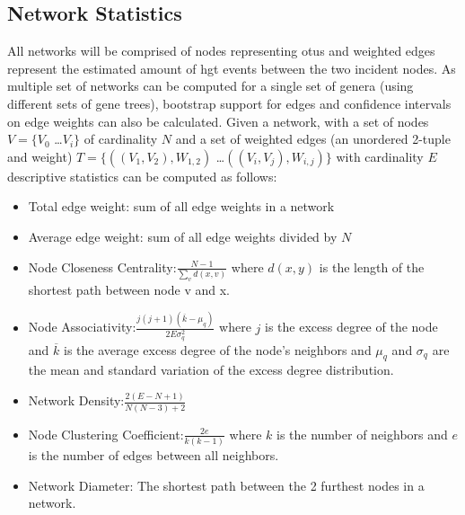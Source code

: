 \documentclass[12pt,letter]{article}
\begin{document}
\subsection{Network Statistics}
All networks will be comprised of nodes representing \ac{otu}s and weighted edges represent the estimated amount of \ac{hgt} events between the two incident nodes.
As multiple set of networks can be computed for a single set of genera (using different sets of gene trees), bootstrap support for edges and confidence intervals on edge weights can also be calculated.
Given a network, with a set of nodes $V = \{V_0$ \dots $V_i\}$ of cardinality $N$ and a set of weighted edges (an unordered 2-tuple and weight) $T = \{((V_1,V_2),W_{1,2})$ \dots $((V_i,V_j),W_{i,j})\}$ with cardinality $E$ descriptive statistics can be computed as follows\citep{netstat}:
\begin{itemize}
    \item Total edge weight: sum of all edge weights in a network
    \item Average edge weight: sum of all edge weights divided by $N$
    \item Node Closeness Centrality:$ \frac{N-1}{\sum_v d(x,v)}$ where $d(x,y)$ is the length of the shortest path between node v and x.
    \item Node Associativity:$ \frac{j(j+1)(\overline{k}-\mu_q)}{2E\sigma^2_q}$ where $j$ is the excess degree of the node and $\overline{k}$ is the average excess degree of the node's neighbors and $\mu_q$ and $\sigma_q$ are the mean and standard variation of the excess degree distribution.
    \item Network Density:$ \frac{2(E-N+1)}{N(N-3)+2}$
    \item Node Clustering Coefficient:$ \frac{2e}{k(k-1)}$ where $k$ is the number of neighbors and $e$ is the number of edges between all neighbors.
    \item Network Diameter: The shortest path between the 2 furthest nodes in a network.
\end{itemize}
\printbibliography
\end{document}

